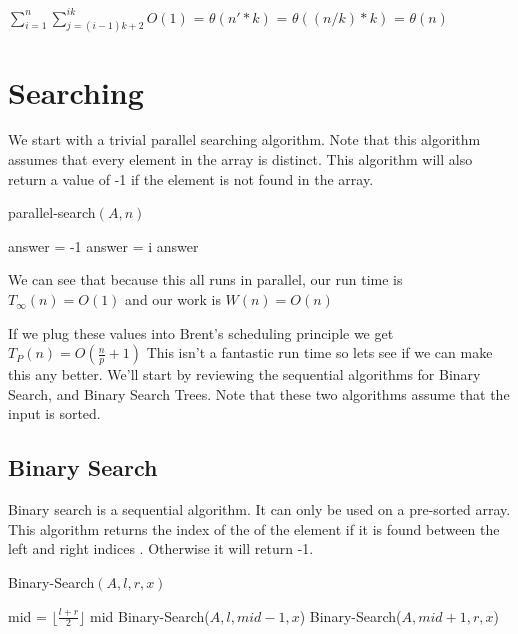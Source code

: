 \documentclass[11pt]{article}
\begin{document}
$\sum_{i=1}^{n} \sum_{j=(i-1)k+2}^{ik}O(1)$ =
$\theta(n'*k)$ =
$\theta((n/k) * k)$ = $\theta(n)$

\section{Searching}

We start with a trivial parallel searching algorithm. Note that this algorithm assumes that every element in the array is distinct. This algorithm will also return a value of -1 if the element is not found in the array.

\begin{algorithm}
\caption{parallel-search$(A,n)$}
\begin{algorithmic}
\STATE answer = -1
	    \STATE answer = i
	\ENDIF
\ENDFOR
\RETURN answer
\end{algorithmic}
\end{algorithm}

We can see that because this all runs in parallel, our run time is $T_\infty(n) = O(1)$ and our work is $W(n) = O(n)$

If we plug these values into Brent's scheduling principle we get
$T_P(n) = O(\frac{n}{p}+1)$ This isn't a fantastic run time so lets see if we can make this any better. We'll start by reviewing the sequential algorithms for Binary Search, and Binary Search Trees. Note that these two algorithms assume that the input is sorted.

\subsection{Binary Search}
Binary search is a sequential algorithm. It can only be used on a pre-sorted array. This algorithm returns the index of the of the element if it is found between the left and right indices . Otherwise it will return -1.
\pagebreak


\begin{algorithm}
\caption{Binary-Search$(A,l,r,x)$}
\begin{algorithmic}
\ELSE
    \STATE mid = $\lfloor\frac{l+r}{2}\rfloor$
        \RETURN mid
        \RETURN Binary-Search($A,l,mid-1,x$)
    \ELSE
        \RETURN Binary-Search($A,mid+1,r,x$)
    \ENDIF
\ENDIF
\end{algorithmic}
\end{algorithm}
\end{document}
